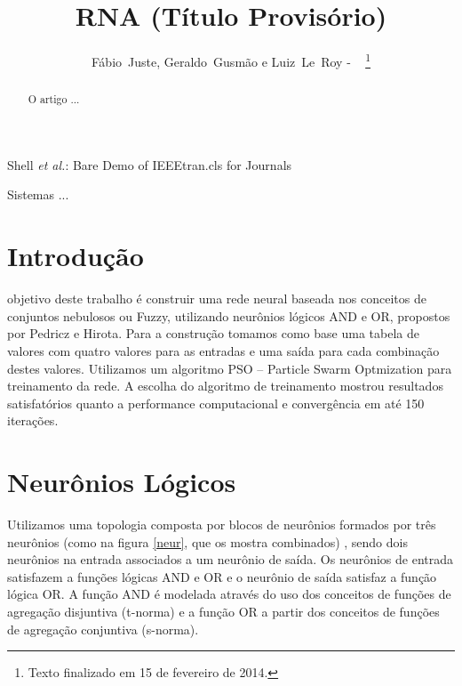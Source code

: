 \documentclass{IEEEtran}
\begin{document}
%
\title{RNA (Título Provisório)}
%
%
%

\author{Fábio~Juste, Geraldo~Gusmão e Luiz~Le~Roy - ~
\thanks{Texto finalizado em 15 de fevereiro de 2014.}}

%
{Shell \MakeLowercase{\textit{et al.}}: Bare Demo of IEEEtran.cls for Journals}

\maketitle

\begin{abstract}
O artigo ...
\end{abstract}

\begin{IEEEkeywords}
Sistemas ...
\end{IEEEkeywords}

\IEEEpeerreviewmaketitle

\section{Introdução}
 objetivo deste trabalho é construir uma rede neural baseada nos conceitos de conjuntos nebulosos ou Fuzzy,  utilizando neurônios lógicos AND e OR, propostos por Pedricz e Hirota.
Para a construção tomamos como base uma  tabela de valores com quatro valores para as entradas e uma saída para cada combinação destes valores. Utilizamos um algoritmo PSO – Particle Swarm Optmization para treinamento da rede.  A escolha do algoritmo de treinamento mostrou resultados satisfatórios quanto a performance computacional  e convergência em até 150 iterações.

\section{Neurônios Lógicos}
Utilizamos uma topologia composta por blocos de neurônios formados por três neurônios (como na figura \ref{neur}, que os mostra combinados) , sendo dois neurônios na entrada associados a um neurônio de saída. Os neurônios de entrada satisfazem a funções lógicas AND e OR e o neurônio de saída satisfaz a função lógica OR. A função AND é modelada  através do uso dos conceitos de funções de agregação disjuntiva (t-norma) e a função OR  a partir dos conceitos de funções de agregação conjuntiva (s-norma).
\end{document}
